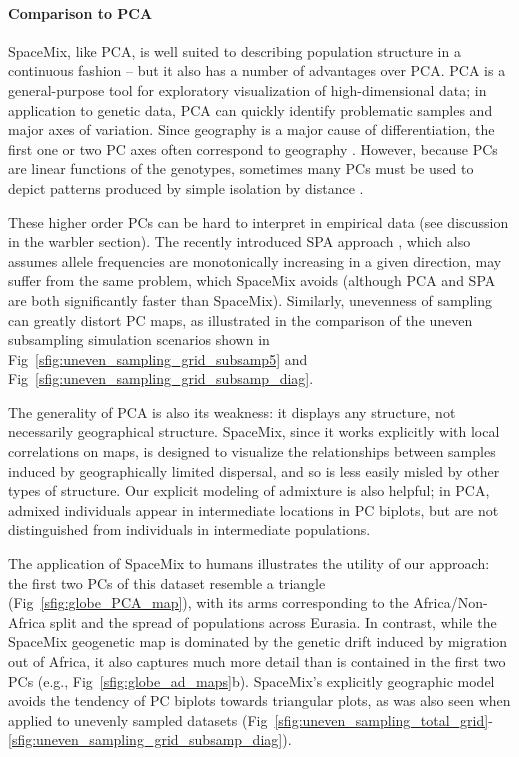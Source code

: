 \documentclass[10pt,letterpaper]{article}
\begin{document}
\paragraph{Comparison to PCA}
SpaceMix, like PCA, is well suited to describing population structure in a continuous fashion --
but it also has a number of advantages over PCA. 
PCA is a general-purpose tool for exploratory visualization of high-dimensional data;
in application to genetic data, PCA can quickly identify problematic samples and major axes of variation.  
Since geography is a major cause of differentiation, the first one or two PC axes often correspond to geography \cite{novembre_interpreting_2008}.  
However, because PCs are linear functions of the genotypes,
sometimes many PCs must be used to depict patterns produced by simple isolation by distance \cite{novembre_interpreting_2008}. 

These higher order PCs can be hard to interpret in empirical data (see discussion in the warbler section).
The recently introduced SPA approach \cite{yang_model-based_2012},
which also assumes allele frequencies are monotonically increasing in a given direction,
may suffer from the same problem, which SpaceMix avoids
(although PCA and SPA are both significantly faster than SpaceMix).  
Similarly, unevenness of sampling can greatly distort PC maps, 
as illustrated in the comparison of the uneven subsampling simulation scenarios 
shown in Fig\ \ref{sfig:uneven_sampling_grid_subsamp5} and Fig\ \ref{sfig:uneven_sampling_grid_subsamp_diag}.

The generality of PCA is also its weakness: 
it displays any structure, not necessarily geographical structure. 
SpaceMix, since it works explicitly with local correlations on maps, 
is designed to visualize the relationships between samples induced by geographically limited dispersal,
and so is less easily misled by other types of structure.
Our explicit modeling of admixture is also helpful; in PCA, admixed individuals appear in intermediate locations in PC biplots, 
but are not distinguished from individuals in intermediate populations.

The application of SpaceMix to humans illustrates the utility of our approach:
 the first two PCs of this dataset resemble a triangle (Fig\
\ref{sfig:globe_PCA_map}),
 with its arms corresponding to the Africa/Non-Africa split and the
spread of populations across Eurasia.
 In contrast, while the SpaceMix geogenetic map is dominated by the
genetic drift induced by migration out of Africa,
 it also captures much more detail than is contained in the first two
PCs (e.g., Fig\
\ref{sfig:globe_ad_maps}b).
SpaceMix's explicitly geographic model avoids the tendency of PC
biplots towards triangular plots,
as was also seen when applied to unevenly sampled datasets
(Fig\ \ref{sfig:uneven_sampling_total_grid}-\ref{sfig:uneven_sampling_grid_subsamp_diag}).
\end{document}
